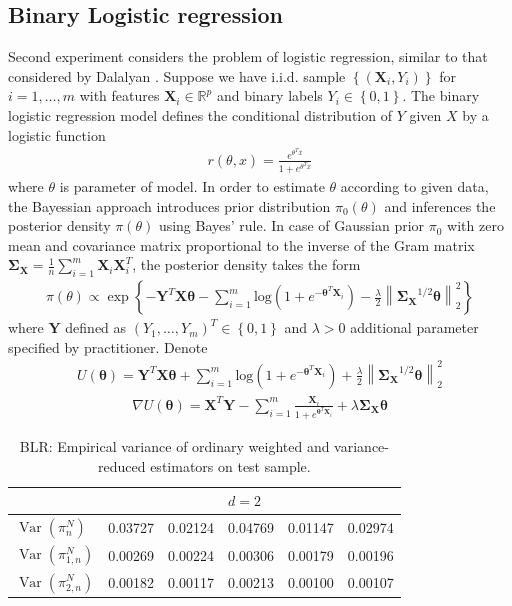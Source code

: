 \documentclass[article]{elsarticle}
\begin{document}
\subsection{Binary Logistic regression}
Second experiment considers the problem of logistic regression, similar to that considered by Dalalyan \cite{dalalyan2017theoretical}. Suppose we have i.i.d. sample $\left\{ (\mathbf{X}_i, Y_i)\right\}$ for $ i =1, \dots , m$ with features $\mathbf{X}_i \in \mathbb{R}^p $ and binary labels $Y_i \in \left\{0,1 \right\}$. The binary logistic regression model defines the conditional distribution of $Y$ given $X$ by a logistic function
\begin{eqnarray*}
r(\theta, x) = \frac{e^{\theta^T x}}{1 + e^{\theta^T x}}
\end{eqnarray*}
where $\theta$ is parameter of model. In order to estimate $\theta$ according to given data, the Bayessian approach introduces prior distribution $\pi_0(\theta)$ and inferences the posterior density $\pi(\theta)$ using Bayes' rule. In case of Gaussian prior $\pi_0$ with zero mean and covariance matrix proportional to the inverse of the Gram matrix $\mathbf{\Sigma_X} = \frac{1}{n} \sum_{i=1}^m \mathbf{X}_i \mathbf{X}_i^T$, the posterior density takes the form
\begin{eqnarray*}
\pi(\theta) \propto \exp \left\{ -  \mathbf{Y}^T \mathbf{X \theta} - \sum_{i=1}^m \text{log} (1 + e^{-\mathbf{\theta}^T \mathbf{X}_i}) - \frac{\lambda}{2} \left\| \mathbf{\Sigma_X}^{1/2} \mathbf{\theta}\right\|_2^2 \right\}
\end{eqnarray*}
where $\mathbf{Y}$ defined as $(Y_1, \dots, Y_m)^T \in \left\{ 0,1\right\}$ and $\lambda > 0$ additional parameter specified by practitioner. Denote
\begin{eqnarray*}
U( \mathbf{\theta}) = \mathbf{Y}^T \mathbf{X \theta} + \sum_{i=1}^m \text{log} (1 + e^{-\mathbf{\theta}^T \mathbf{X}_i}) + \frac{\lambda}{2} \left\| \mathbf{\Sigma_X}^{1/2} \mathbf{\theta}\right\|_2^2
\end{eqnarray*}
\begin{eqnarray*}
\nabla U(\mathbf{\theta}) = \mathbf{X}^T \mathbf{Y} - \sum_{i=1}^m \frac{\mathbf{X}_i}{1 + e^{\mathbf{\theta}^T \mathbf{X}_i}} + \lambda \mathbf{\Sigma_X \theta}
\end{eqnarray*}

\begin{table}[h]
\begin{tabular}{|l|lllll|}	
\hline
 &  &  &\(d = 2\)  &  &  \\ \hline
$\operatorname{Var}(\pi_n^N)$    & 0.03727 &  0.02124 &  0.04769  & 0.01147  & 0.02974   \\
$\operatorname{Var}(\pi_{1,n}^N)$& 0.00269 &  0.00224 &  0.00306  & 0.00179  & 0.00196  \\
$\operatorname{Var}(\pi_{2,n}^N)$& 0.00182 &  0.00117 &  0.00213  & 0.00100  & 0.00107 \\ \hline
\end{tabular}
\caption{BLR: Empirical variance of ordinary weighted and variance-reduced estimators on test sample.}
\label{table:blr}
\end{table}
\end{document}
